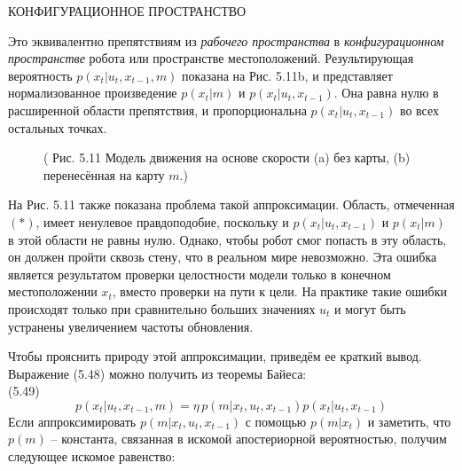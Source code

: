 \documentclass[10pt,a4paper]{article}
\begin{document}
КОНФИГУРАЦИОННОЕ ПРОСТРАНСТВО

Это эквивалентно препятствиям из \textit{рабочего пространства} в \textit{конфигурационном пространстве} робота или пространстве местоположений. Результирующая вероятность $p(x_t | u_t, x_{t-1}, m)$ показана на Рис. 5.11b, и представляет нормализованное произведение $p(x_t | m)$ и $p(x_t | u_t, x_{t-1})$. Она равна нулю в расширенной области препятствия, и пропорциональна $p(x_t | u_t, x_{t-1})$ во всех остальных точках.\\

\begin{figure}[H]
	\caption{ (  Рис. 5.11 Модель движения на основе скорости (a) без карты, (b) перенесённая на карту $m$.)}
	\label{fig:511orig}
\end{figure}

На Рис. 5.11 также показана проблема такой аппроксимации. Область, отмеченная $(\ast)$, имеет ненулевое правдоподобие, поскольку и $p(x_t | u_t, x_{t-1})$ и $p(x_t | m)$ в этой области не равны нулю. Однако, чтобы робот смог попасть в эту область, он должен пройти сквозь стену, что в реальном мире невозможно. Эта ошибка является результатом проверки целостности модели только в конечном местоположении $x_t$, вместо проверки на пути к цели. На практике такие ошибки происходят только при сравнительно больших значениях $u_t$ и могут быть устранены увеличением частоты обновления.

Чтобы прояснить природу этой аппроксимации, приведём ее краткий вывод.
Выражение (5.48) можно получить из теоремы Байеса:\\

(5.49)
$$p(x_t|u_t,x_{t-1},m)=\eta\,p(m|x_t,u_t,x_{t-1})p(x_t|u_t,x_{t-1})$$
Если аппроксимировать  $p(m | x_t, u_t, x_{t-1})$ с помощью $p(m | x_t)$ и заметить, что $p(m)$ – константа, связанная в искомой апостериорной вероятностью, получим следующее искомое равенство:\\
\end{document}
